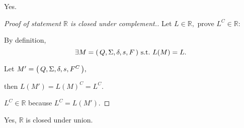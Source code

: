 \begin{example}
    Yes.

    \begin{proof}[Proof of statement $\mathbb R$ is closed under complement.]
        Let $L \in \mathbb R,$
        prove $L^C \in \mathbb R:$

        By definition, 
        \[
            \exists \DFA \text{ s.t.\ } L(M) = L.
        \]

        Let $M' = { \left(\,Q,\Sigma,\delta,s,F^C\,\right) },$

        then $L(M') = L(M)^C = L^C.$

        $L^C \in \mathbb R$ because $L^C = L(M').$
    \end{proof}
\end{example}

\begin{example}
    \label{exa:R_closed_under_union}
    Yes, $\mathbb R$ is closed under union.
\end{example}

